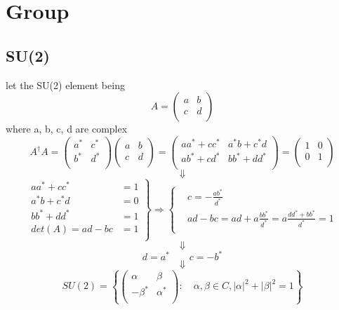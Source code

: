 \section{Group}
\subsection{SU(2)}
let the SU(2) element being 
\begin{equation*}
    A = 
    \begin{pmatrix}
	a   & b	\\
	c   & d	\\
    \end{pmatrix}
\end{equation*}
where a, b, c, d are complex
\begin{equation*}
    A^\dag A = 
    \begin{pmatrix}
	a^* & c^* \\
	b^* & d^*   \\
    \end{pmatrix}
    \begin{pmatrix}
	a   & b	\\
	c   & d	\\
    \end{pmatrix}
    =
    \begin{pmatrix}
	aa^* + cc^* & a^*b + c^*d   \\
	ab^* + cd^* & bb^* + dd^*   \\
    \end{pmatrix}
    =
    \begin{pmatrix}
	1   & 0	\\
	0   & 1	\\
    \end{pmatrix}
\end{equation*}
$$ \Downarrow $$
\begin{equation*}
    \left.
    \begin{aligned}
	aa^* + cc^* &= 1 \\
	a^*b + c^*d &= 0 \\
	bb^* + dd^* &= 1 \\
	det(A) = ad - bc &= 1	\\
    \end{aligned}
    \right\}
    \Rightarrow
    \left\{
    \begin{aligned}
	&c = -\frac{ab^*}{d^*}	\\
	&ad - bc = ad + a \frac{bb^*}{d^*} = a \frac{dd^*+ bb^*}{d^*} = 1	\\
    \end{aligned}
	\right.
\end{equation*}
$$ \Downarrow $$
\begin{equation*}
    d = a^* \qquad c = -b^*
\end{equation*}
$$ \Downarrow $$
\begin{equation*}
 SU(2) = \left\{ 
    \begin{pmatrix}
	\alpha	& \beta	\\
	-\beta^*    & \alpha^*	\\
    \end{pmatrix}
    : \quad
    \alpha, \beta \in C, |\alpha|^2 + |\beta|^2 = 1
\right\}
\end{equation*}
